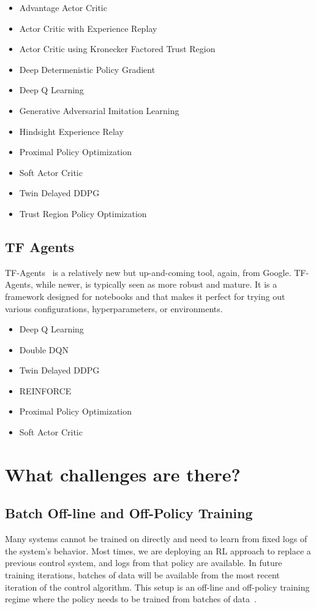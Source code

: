 \documentclass[letterpaper, 10 pt]{IEEEconf}
\begin{document}
\begin{itemize}
\item Advantage Actor Critic
\item Actor Critic with Experience Replay
\item Actor Critic using Kronecker Factored Trust Region
\item Deep Determenistic Policy Gradient
\item Deep Q Learning
\item Generative Adversarial Imitation Learning
\item Hindsight Experience Relay
\item Proximal Policy Optimization
\item Soft Actor Critic
\item Twin Delayed DDPG
\item Trust Region Policy Optimization
\end{itemize}

\subsection{TF Agents}

TF-Agents~\cite{TFAgents} is a relatively new but up-and-coming tool, again, from
Google.  TF-Agents, while newer, is typically seen as more robust and
mature. It is a framework designed for notebooks and that makes it
perfect for trying out various configurations, hyperparameters, or
environments. 

\begin{itemize}
\item Deep Q Learning
\item Double DQN
\item Twin Delayed DDPG
\item REINFORCE
\item Proximal Policy Optimization
\item Soft Actor Critic
\end{itemize}

\section{What challenges are there?}

\subsection{Batch Off-line and Off-Policy Training}

Many systems cannot be trained on directly and need to learn from
fixed logs of the system’s behavior. Most times, we are deploying an
RL approach to replace a previous control system, and logs from that
policy are available. In future training iterations, batches of data
will be available from the most recent iteration of the control
algorithm. This setup is an off-line and off-policy training regime
where the policy needs to be trained from batches of data~\cite{deepmind2019}.
\end{document}
